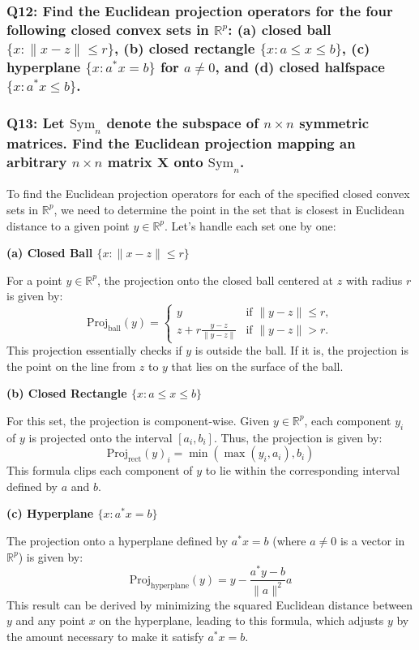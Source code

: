 \documentclass[8pt]{article}
\begin{document}
{\subsubsection*{Q12: Find the Euclidean projection operators for the four following closed convex sets in \(\mathbb{R}^p\): (a) closed ball \(\{x : \|x - z\| \leq r\}\), (b) closed rectangle \(\{x : a \leq x \leq b\}\), (c) hyperplane \(\{x : a^* x = b\}\) for \(a \neq 0\), and (d) closed halfspace \(\{x : a^* x \leq b\}\).}

\subsubsection*{Q13: Let \(\mathrm{Sym}_n\) denote the subspace of \(n \times n\) symmetric matrices. Find the Euclidean projection mapping an arbitrary \(n \times n\) matrix \(\mathbf{X}\) onto \(\mathrm{Sym}_n\).}

To find the Euclidean projection operators for each of the specified closed convex sets in \(\mathbb{R}^p\), we need to determine the point in the set that is closest in Euclidean distance to a given point \(y \in \mathbb{R}^p\). Let's handle each set one by one:

\textbf{(a) Closed Ball \(\{x : \|x - z\| \leq r\}\)}

For a point \(y \in \mathbb{R}^p\), the projection onto the closed ball centered at \(z\) with radius \(r\) is given by:
\[ \text{Proj}_{\text{ball}}(y) = \begin{cases} 
y & \text{if } \|y - z\| \leq r, \\
z + r \frac{y - z}{\|y - z\|} & \text{if } \|y - z\| > r.
\end{cases} \]
This projection essentially checks if \(y\) is outside the ball. If it is, the projection is the point on the line from \(z\) to \(y\) that lies on the surface of the ball.

\textbf{(b) Closed Rectangle \(\{x : a \leq x \leq b\}\)}

For this set, the projection is component-wise. Given \(y \in \mathbb{R}^p\), each component \(y_i\) of \(y\) is projected onto the interval \([a_i, b_i]\). Thus, the projection is given by:
\[ \text{Proj}_{\text{rect}}(y)_i = \min(\max(y_i, a_i), b_i) \]
This formula clips each component of \(y\) to lie within the corresponding interval defined by \(a\) and \(b\).

\textbf{(c) Hyperplane \(\{x : a^* x = b\}\)}

The projection onto a hyperplane defined by \(a^* x = b\) (where \(a \neq 0\) is a vector in \(\mathbb{R}^p\)) is given by:
\[ \text{Proj}_{\text{hyperplane}}(y) = y - \frac{a^* y - b}{\|a\|^2} a \]
This result can be derived by minimizing the squared Euclidean distance between \(y\) and any point \(x\) on the hyperplane, leading to this formula, which adjusts \(y\) by the amount necessary to make it satisfy \(a^* x = b\).

}
\end{document}
